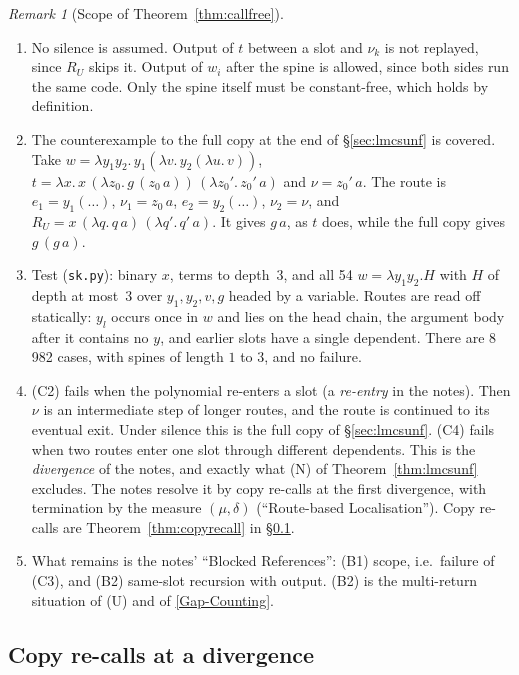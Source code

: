 \documentclass[11pt]{article}
\theoremstyle{plain}
\theoremstyle{definition}
\theoremstyle{remark}
\newtheorem{remark}[theorem]{Remark}
\newcommand{\GapCounting}{\hyperref[gap:count]{[Gap-Counting]}}
\begin{document}
\begin{remark}[Scope of Theorem~\ref{thm:callfree}]\label{rem:callfree}
\begin{enumerate}
\item No silence is assumed.  Output of $t$ between a slot and $\nu_k$ is
  not replayed, since $R_U$ skips it.  Output of $w_i$ after the spine is
  allowed, since both sides run the same code.  Only the spine itself
  must be constant-free, which holds by definition.
\item The counterexample to the full copy at the end of
  \S\ref{sec:lmcsunf} is covered.  Take
  $w=\lambda y_1y_2.\,y_1(\lambda v.\,y_2(\lambda u.\,v))$,
  $t=\lambda x.\,x\,(\lambda z_0.\,g\,(z_0\,a))\,(\lambda z_0'.\,z_0'\,a)$
  and $\nu=z_0'\,a$.  The route is $e_1=y_1(\dots)$, $\nu_1=z_0\,a$,
  $e_2=y_2(\dots)$, $\nu_2=\nu$, and
  $R_U=x\,(\lambda q.\,q\,a)\,(\lambda q'.\,q'\,a)$.  It gives $g\,a$, as
  $t$ does, while the full copy gives $g\,(g\,a)$.
\item Test (\texttt{sk.py}): binary $x$, terms to depth~$3$, and all 54
  $w=\lambda y_1y_2.H$ with $H$ of depth at most~$3$ over $y_1,y_2,v,g$
  headed by a variable.  Routes are read off statically: $y_l$ occurs
  once in $w$ and lies on the head chain, the argument body after it
  contains no $y$, and earlier slots have a single dependent.  There are
  8\,982 cases, with spines of length $1$ to $3$, and no failure.
\item (C2) fails when the polynomial re-enters a slot (a \emph{re-entry}
  in the notes).  Then $\nu$ is an intermediate step of longer routes,
  and the route is continued to its eventual exit.  Under silence this
  is the full copy of \S\ref{sec:lmcsunf}.  (C4) fails when two routes
  enter one slot through different dependents.  This is the
  \emph{divergence} of the notes, and exactly what (N) of
  Theorem~\ref{thm:lmcsunf} excludes.  The notes resolve it by copy
  re-calls at the first divergence, with termination by the measure
  $(\mu,\delta)$ (``Route-based Localisation'').  Copy re-calls are
  Theorem~\ref{thm:copyrecall} in \S\ref{sec:copyrecall}.
\item What remains is the notes' ``Blocked References'': (B1) scope, i.e.\
  failure of (C3), and (B2) same-slot recursion with output.  (B2) is the
  multi-return situation of (U) and of \GapCounting{}.
\end{enumerate}
\end{remark}


\subsection{Copy re-calls at a divergence}\label{sec:copyrecall}
\end{document}
